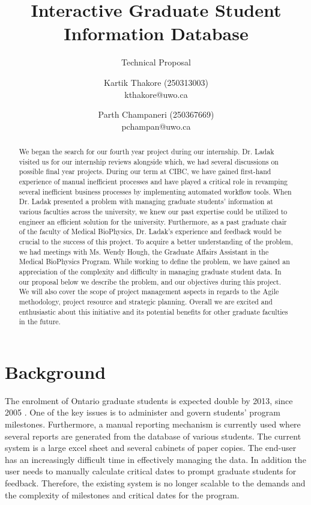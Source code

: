 \documentclass{journal}
\begin{document}

\title{Interactive Graduate Student Information Database}
\subtitle{Technical Proposal} 
\author{Kartik Thakore (250313003)\\kthakore@uwo.ca \and Parth Champaneri (250367669)\\pchampan@uwo.ca}
\maketitle

\begin{abstract}
We began the search for our fourth year project during our internship. Dr. Ladak visited us for our internship reviews alongside which, we had several discussions on possible final year projects. During our term at CIBC, we have gained first-hand experience of manual inefficient processes and have played a critical role in revamping several inefficient business processes by implementing automated workflow tools. When Dr. Ladak presented a problem with managing graduate students’ information at various faculties across the university, we knew our past expertise could be utilized to engineer an efficient solution for the university. Furthermore, as a past graduate chair of the faculty of Medical BioPhysics, Dr. Ladak's experience and feedback would be crucial to the success of this project. To acquire a better understanding of the problem, we had meetings with Ms. Wendy Hough, the Graduate Affairs Assistant in the Medical BioPhysics Program. While working to define the problem, we have gained an appreciation of the complexity and difficulty in managing graduate student data. In our proposal below we describe the problem, and our objectives during this project. We will also cover the scope of project management aspects in regards to the Agile methodology, project resource and strategic planning. Overall we are excited and enthusiastic about this initiative and its potential benefits for other graduate faculties in the future.
\end{abstract}

\section{Background}

The enrolment of Ontario graduate students is expected double by 2013, since 2005 \cite{con_high}.  One of the key issues is to administer and govern students' program milestones. Furthermore, a manual reporting mechanism is currently used where several reports are generated from the database of various students.
The current system is a large excel sheet and several cabinets of paper copies. The end-user has an increasingly difficult time in effectively managing 
the data. In addition the user needs to manually calculate critical dates to prompt graduate students for feedback. Therefore, the existing system is no longer scalable to the demands and the complexity of milestones and critical dates for the program. 
\end{document}
